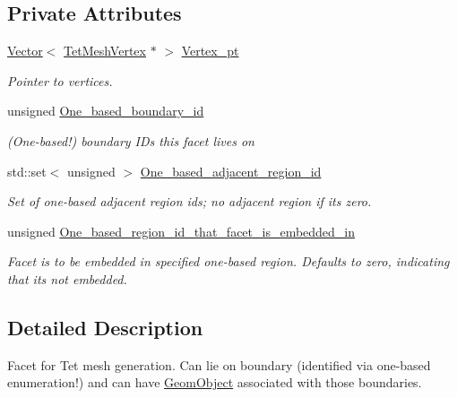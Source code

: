 \subsection*{Private Attributes}
\begin{DoxyCompactItemize}
\item 
\hyperlink{classoomph_1_1Vector}{Vector}$<$ \hyperlink{classoomph_1_1TetMeshVertex}{Tet\+Mesh\+Vertex} $\ast$ $>$ \hyperlink{classoomph_1_1TetMeshFacet_a04408ee7d013283e6ca4c109da15d5e2}{Vertex\+\_\+pt}
\begin{DoxyCompactList}\small\item\em Pointer to vertices. \end{DoxyCompactList}\item 
unsigned \hyperlink{classoomph_1_1TetMeshFacet_ab7defe35a8a9ca959852131df5436cc1}{One\+\_\+based\+\_\+boundary\+\_\+id}
\begin{DoxyCompactList}\small\item\em (One-\/based!) boundary I\+Ds this facet lives on \end{DoxyCompactList}\item 
std\+::set$<$ unsigned $>$ \hyperlink{classoomph_1_1TetMeshFacet_a4fda6667fb015320fa128df5b3ce5316}{One\+\_\+based\+\_\+adjacent\+\_\+region\+\_\+id}
\begin{DoxyCompactList}\small\item\em Set of one-\/based adjacent region ids; no adjacent region if it\textquotesingle{}s zero. \end{DoxyCompactList}\item 
unsigned \hyperlink{classoomph_1_1TetMeshFacet_ac3fcb94904c86c64b391bb15ceca1706}{One\+\_\+based\+\_\+region\+\_\+id\+\_\+that\+\_\+facet\+\_\+is\+\_\+embedded\+\_\+in}
\begin{DoxyCompactList}\small\item\em Facet is to be embedded in specified one-\/based region. Defaults to zero, indicating that its not embedded. \end{DoxyCompactList}\end{DoxyCompactItemize}


\subsection{Detailed Description}
Facet for Tet mesh generation. Can lie on boundary (identified via one-\/based enumeration!) and can have \hyperlink{classoomph_1_1GeomObject}{Geom\+Object} associated with those boundaries. 

